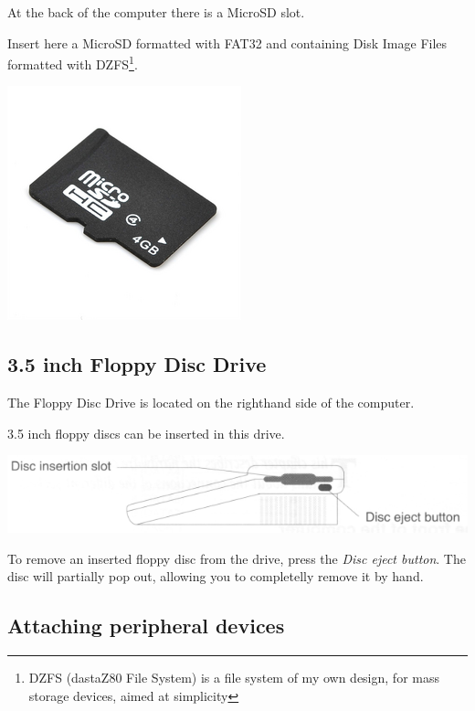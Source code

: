     At the back of the computer there is a MicroSD slot.

    Insert here a MicroSD formatted with FAT32 and containing Disk Image
    Files formatted with DZFS\footnote{DZFS (dastaZ80 File System) is a file
    system of my own design, for mass storage devices, aimed at simplicity}.

    \centerline{\includegraphics[scale=0.5]{images/microsdcard.png}}

    \subsection{3.5 inch Floppy Disc Drive}

    The Floppy Disc Drive is located on the righthand side of the computer.

    3.5 inch floppy discs can be inserted in this drive. 

    \includegraphics[scale=0.7]{images/discslot.png}

    To remove an inserted floppy disc from the drive, press the
    \textit{Disc eject button}. The disc will partially pop out, allowing you to
    completelly remove it by hand.

    \subsection{Attaching peripheral devices}

